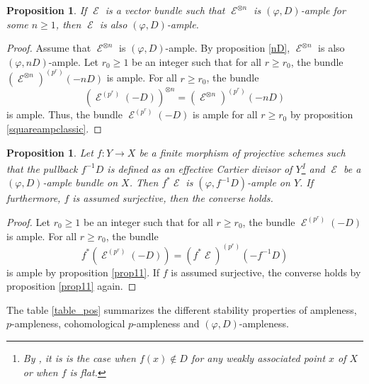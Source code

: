 \documentclass[11pt]{amsart}
\numberwithin{subsection}{section}
\numberwithin{figure}{section}
\numberwithin{table}{section}
\theoremstyle{1}
\newtheorem{proposition}[theorem]{Proposition}
\theoremstyle{2}
\DeclareMathOperator{\E}{\mathcal{E}}
\begin{document}
\begin{proposition}\label{squarephiD}
If $\E$ is a vector bundle such that $\E^{\otimes n}$ is $(\varphi,D)$-ample for some $n\geq 1$, then $\E$ is also $(\varphi,D)$-ample.
\end{proposition}
\begin{proof}
Assume that $\E^{\otimes n}$ is $(\varphi,D)$-ample. By proposition \ref{nD}, $\E^{\otimes n}$ is also $(\varphi,nD)$-ample. Let $r_0 \geq 1$ be an integer such that for all $r \geq r_0$, the bundle ${(\E^{\otimes n})}^{(p^r)}(-nD)$ is ample. For all $r \geq r_0$, the bundle
\begin{equation*}
{(\E^{(p^r)}(-D))}^{\otimes n} = {(\E^{\otimes n})}^{(p^r)}(-nD)
\end{equation*}
is ample. Thus, the bundle $\E^{(p^r)}(-D)$ is ample for all $r \geq r_0$ by proposition \ref{squareampclassic}.
\end{proof}
\begin{proposition}\label{prop18}
Let $f : Y \rightarrow X$ be a finite morphism of projective schemes such that the pullback $f^{-1}D$ is defined as an effective Cartier divisor of $Y$\footnote{By \cite[\href{https://stacks.math.columbia.edu/tag/02OO}{Lemma 02OO}]{stacks-project}, it is is the case when $f(x) \notin D$ for any weakly associated point $x$ of $X$ or when $f$ is flat.} and $\E$ be a $(\varphi,D)$-ample bundle on $X$. Then $f^*\E$ is $(\varphi,f^{-1}D)$-ample on $Y$. If furthermore, $f$ is assumed surjective, then the converse holds.
\end{proposition}
\begin{proof}
Let $r_0 \geq 1$ be an integer such that for all $r \geq r_0$, the bundle $\E^{(p^r)}(-D)$ is ample. For all $r\geq r_0$, the bundle
\begin{equation*}
f^*(\E^{(p^r)}(-D)) = {(f^*\E)}^{(p^r)}(-f^{-1}D)
\end{equation*}
is ample by proposition \ref{prop11}. If $f$ is assumed surjective, the converse holds by proposition \ref{prop11} again.
\end{proof}
The table \ref{table_pos} summarizes the different stability properties of ampleness, $p$-ampleness, cohomological $p$-ampleness and $(\varphi,D)$-ampleness.
\end{document}
